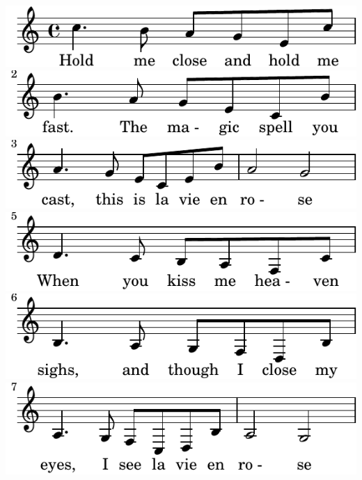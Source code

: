 \includegraphics{26/lily-9a153180-1}%
\ifx\betweenLilyPondSystem \undefined
  \linebreak
\else
  \expandafter{}%
\fi
\includegraphics{26/lily-9a153180-2}%
\ifx\betweenLilyPondSystem \undefined
  \linebreak
\else
  \expandafter{}%
\fi
\includegraphics{26/lily-9a153180-3}%
\ifx\betweenLilyPondSystem \undefined
  \linebreak
\else
  \expandafter{}%
\fi
\includegraphics{26/lily-9a153180-4}%
\ifx\betweenLilyPondSystem \undefined
  \linebreak
\else
  \expandafter{}%
\fi
\includegraphics{26/lily-9a153180-5}%
\ifx\betweenLilyPondSystem \undefined
  \linebreak
\else
  \expandafter{}%
\fi
\includegraphics{26/lily-9a153180-6}%
